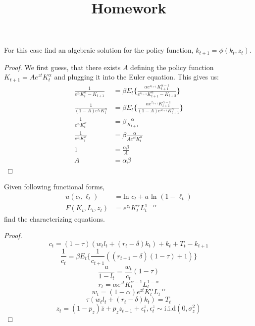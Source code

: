 \documentclass[12pt]{article}
\title{Homework}
\newenvironment{problem}[2][Problem]{\begin{trivlist}
\item[\hskip \labelsep {\bfseries #1}\hskip \labelsep {\bfseries #2.}]}{\end{trivlist}}
\begin{document}
\begin{problem}{1}
For this case find an algebraic solution for the policy function, $k_{t+1} = \phi(k_t,z_t)$.
\begin{proof}
 We first guess, that there exists $A$ defining the policy function $K_{t+1} = Ae^{zt}K_t^\alpha$ and plugging it into the Euler equation. This gives us:
\begin{align*}
\frac{1}{ e^{z_t} K_t^\alpha - K_{t+1}} &= \beta E_t \big\{\frac{\alpha e^{z_{t+1}} K_{t+1}^{\alpha-1}}{e^{z_{t+1}}K_{t+1}^\alpha - K_{t+2}}\big\} \\
\frac{1}{ (1-A)e^{z_t} K_t^\alpha} &= \beta E_t \big\{\frac{\alpha e^{z_{t+1}} K_{t+1}^{\alpha-1}}{(1-A)e^{z_{t+1}}K_{t+1}^\alpha}\big\} \\
\frac{1}{ e^{z_t} K_t^\alpha} &= \beta \frac{\alpha}{K_{t+1}}\\
\frac{1}{ e^{z_t} K_t^\alpha} &= \beta \frac{\alpha}{Ae^{zt}K_t^\alpha}\\
1 &= \frac{\alpha \beta}{A}\\
A &= \alpha\beta
\end{align*}
\end{proof}
\end{problem}


\begin{problem}{2}
Given following functional forms,
\begin{equation}
\begin{split}
u(c_t,\ell_t) & = \text{ln }c_t + a \text{ ln }(1-\ell_t)\\
F(K_t,L_t,z_t) & = e^{z_t}K^{\alpha}_t L^{1-\alpha}_t  \nonumber
\end{split}
\end{equation} find the characterizing equations.
\begin{proof}
$$c_t = (1-\tau)(w_tl_t + (r_t -\delta)k_t) + k_t + T_t - k_{t+1}$$
$$\frac{1}{c_t} = \beta E_t \big\{ \frac{1}{c_{t+1}}((r_{t+1} - \delta)(1-\tau)+ 1) \big\}$$
$$\frac{a}{1-l_t} = \frac{w_t}{c_t}(1-\tau)$$
$$r_t = \alpha e^{zt}K_t^{\alpha-1} L_t^{1-\alpha}$$
$$w_t = (1-\alpha) e^{zt}K_t^{\alpha} L_t^{-\alpha}$$
$$\tau(w_tl_t + (r_t -\delta)k_t) = T_t$$
$$z_t = (1-p_z)\bar{z} + p_zz_{t-1} + \epsilon^z_t,  \epsilon^z_t \sim \text{i.i.d}(0, \sigma^2_z)$$
\end{proof}
\end{problem}

\end{document}
